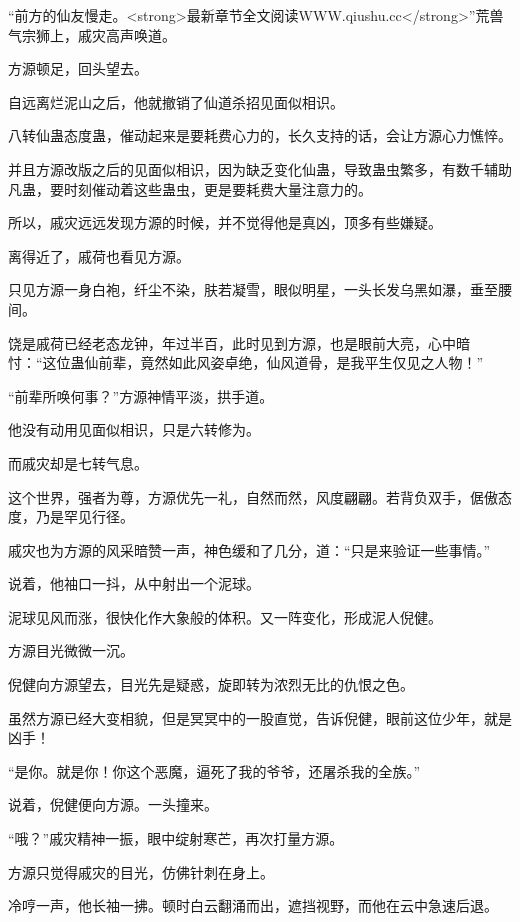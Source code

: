 
\begin{this_body}

“前方的仙友慢走。<strong>最新章节全文阅读WWW.qiushu.cc</strong>”荒兽气宗狮上，戚灾高声唤道。

方源顿足，回头望去。

自远离烂泥山之后，他就撤销了仙道杀招见面似相识。

八转仙蛊态度蛊，催动起来是要耗费心力的，长久支持的话，会让方源心力憔悴。

并且方源改版之后的见面似相识，因为缺乏变化仙蛊，导致蛊虫繁多，有数千辅助凡蛊，要时刻催动着这些蛊虫，更是要耗费大量注意力的。

所以，戚灾远远发现方源的时候，并不觉得他是真凶，顶多有些嫌疑。

离得近了，戚荷也看见方源。

只见方源一身白袍，纤尘不染，肤若凝雪，眼似明星，一头长发乌黑如瀑，垂至腰间。

饶是戚荷已经老态龙钟，年过半百，此时见到方源，也是眼前大亮，心中暗忖：“这位蛊仙前辈，竟然如此风姿卓绝，仙风道骨，是我平生仅见之人物！”

“前辈所唤何事？”方源神情平淡，拱手道。

他没有动用见面似相识，只是六转修为。

而戚灾却是七转气息。

这个世界，强者为尊，方源优先一礼，自然而然，风度翩翩。若背负双手，倨傲态度，乃是罕见行径。

戚灾也为方源的风采暗赞一声，神色缓和了几分，道：“只是来验证一些事情。”

说着，他袖口一抖，从中射出一个泥球。

泥球见风而涨，很快化作大象般的体积。又一阵变化，形成泥人倪健。

方源目光微微一沉。

倪健向方源望去，目光先是疑惑，旋即转为浓烈无比的仇恨之色。

虽然方源已经大变相貌，但是冥冥中的一股直觉，告诉倪健，眼前这位少年，就是凶手！

“是你。就是你！你这个恶魔，逼死了我的爷爷，还屠杀我的全族。”

说着，倪健便向方源。一头撞来。

“哦？”戚灾精神一振，眼中绽射寒芒，再次打量方源。

方源只觉得戚灾的目光，仿佛针刺在身上。

冷哼一声，他长袖一拂。顿时白云翻涌而出，遮挡视野，而他在云中急速后退。


\end{this_body}
